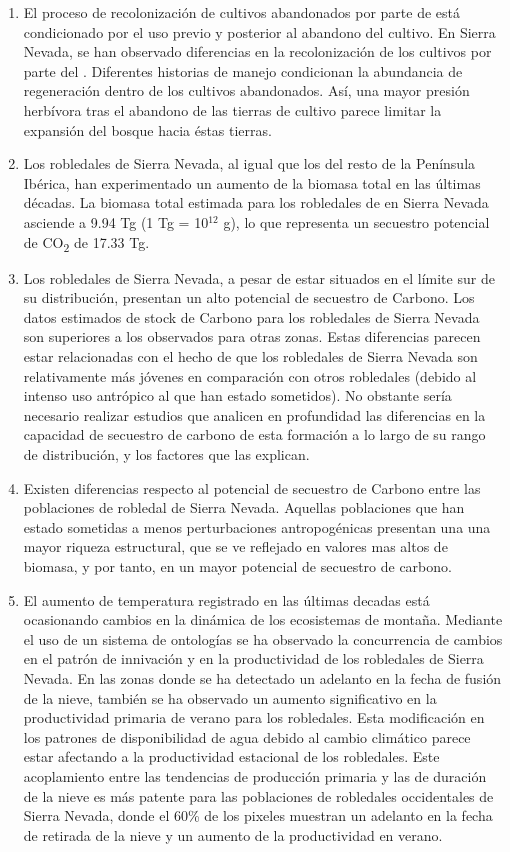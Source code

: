\begin{enumerate}
    \item El proceso de recolonización de cultivos abandonados por parte de \Qp está condicionado por el uso previo y posterior al abandono del cultivo. En Sierra Nevada, se han observado diferencias en la recolonización de los cultivos por parte del \Qp. Diferentes historias de manejo condicionan la abundancia de regeneración dentro de los cultivos abandonados. Así, una mayor presión herbívora tras el abandono de las tierras de cultivo parece limitar la expansión del bosque hacia éstas tierras.
    
    \item Los robledales de Sierra Nevada, al igual que los del resto de la Península Ibérica, han experimentado un aumento de la biomasa total en las últimas décadas. La biomasa total estimada para los robledales de \Qp en Sierra Nevada asciende a 9.94 Tg (1 Tg = 10$^{12}$ g), lo que representa un secuestro potencial de CO\textsubscript{2} de 17.33 Tg. 
    
    \item Los robledales de Sierra Nevada, a pesar de estar situados en el límite sur de su distribución, presentan un alto potencial de secuestro de Carbono. Los datos estimados de stock de Carbono para los robledales de Sierra Nevada son superiores a los observados para otras zonas. Estas diferencias parecen estar relacionadas con el hecho de que los robledales de Sierra Nevada son relativamente más jóvenes en comparación con otros robledales (debido al intenso uso antrópico al que han estado sometidos). No obstante sería necesario realizar estudios que analicen en profundidad las diferencias en la capacidad de secuestro de carbono de esta formación a lo largo de su rango de distribución, y los factores que las explican. 
    
    \item Existen diferencias respecto al potencial de secuestro de Carbono entre las poblaciones de robledal de Sierra Nevada. Aquellas poblaciones que han estado sometidas a menos perturbaciones antropogénicas presentan una una mayor riqueza estructural, que se ve reflejado en valores mas altos de biomasa, y por tanto, en un mayor potencial de secuestro de carbono. 

    \item El aumento de temperatura registrado en las últimas decadas está ocasionando cambios en la dinámica de los ecosistemas de montaña. Mediante el uso de un sistema de ontologías se ha observado la concurrencia de cambios en el patrón de innivación y en la productividad de los robledales de Sierra Nevada. En las zonas donde se ha detectado un adelanto en la fecha de fusión de la nieve, también se ha observado un aumento significativo en la productividad primaria de verano para los robledales. Esta modificación en los patrones de disponibilidad de agua debido al cambio climático parece estar afectando a la productividad estacional de los robledales. Este acoplamiento entre las tendencias de producción primaria y las de duración de la nieve es más patente para las poblaciones de robledales occidentales de Sierra Nevada, donde el 60\% de los pixeles muestran un adelanto en la fecha de retirada de la nieve y un aumento de la productividad en verano. 
    

\end{enumerate}
